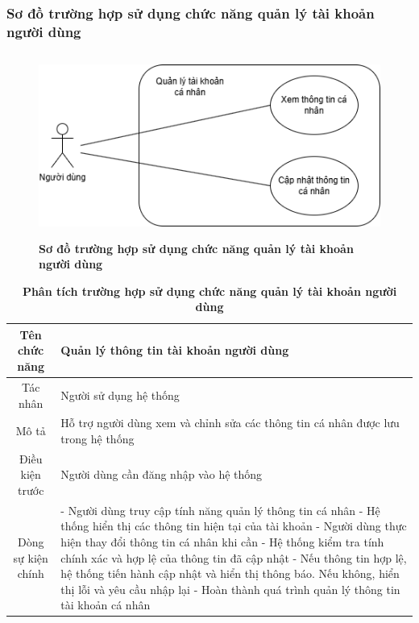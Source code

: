 \subsubsection{Sơ đồ trường hợp sử dụng chức năng quản lý tài khoản người dùng}

\begin{figure}[H]
	\centering
	\includegraphics[width=12cm,height=6cm]{Images/use_case/use_case_account_info.png}
	\caption[Sơ đồ trường hợp sử dụng chức năng quản lý tài khoản người dùng]{\bfseries \fontsize{12pt}{0pt}
		\selectfont Sơ đồ trường hợp sử dụng chức năng quản lý tài khoản người dùng}
	\label{use_case_account_info} %
\end{figure}

\begin{table}[H]
	\caption{\bfseries \fontsize{12pt}{0pt}\selectfont Phân tích trường hợp sử dụng chức năng quản lý tài khoản người dùng}
	\centering
	\begin{tabularx}{0.9\textwidth}{|c|X|}
		\hline
		\textbf{Tên chức năng} & \textbf{Quản lý thông tin tài khoản người dùng}                                  \\
		\hline
		Tác nhân               & Người sử dụng hệ thống                                                           \\
		\hline
		Mô tả                  & Hỗ trợ người dùng xem và chỉnh sửa các thông tin cá nhân được lưu trong hệ thống \\
		\hline
		Điều kiện trước        & Người dùng cần đăng nhập vào hệ thống                                            \\
		\hline
		Dòng sự kiện chính     &
		- Người dùng truy cập tính năng quản lý thông tin cá nhân \newline
		- Hệ thống hiển thị các thông tin hiện tại của tài khoản \newline
		- Người dùng thực hiện thay đổi thông tin cá nhân khi cần \newline
		- Hệ thống kiểm tra tính chính xác và hợp lệ của thông tin đã cập nhật \newline
		- Nếu thông tin hợp lệ, hệ thống tiến hành cập nhật và hiển thị thông báo. Nếu không, hiển thị lỗi và yêu cầu nhập lại \newline
		- Hoàn thành quá trình quản lý thông tin tài khoản cá nhân                                                \\
		\hline
	\end{tabularx}
\end{table}

